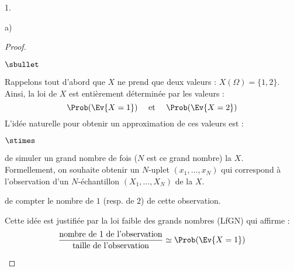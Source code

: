 \documentclass[11pt]{article}%
\begin{document}
\begin{noliste}{1.}
\begin{noliste}{a)}
\begin{proof}
\begin{noliste}{$\sbullet$}
      \item Rappelons tout d'abord que $X$ ne prend que deux valeurs :
        $X(\Omega) = \{1, 2\}$.\\
        Ainsi, la loi de $X$ est entièrement déterminée par les
        valeurs :
        \[
        \Prob(\Ev{X = 1}) \quad \text{ et } \quad \Prob(\Ev{X = 2})
        \]
        L'idée naturelle pour obtenir un approximation de ces valeurs
        est : 
        \begin{noliste}{$\stimes$}
        \item de simuler un grand nombre de fois ($N$ est ce grand
          nombre) la \var $X$.\\
          Formellement, on souhaite obtenir un $N$-uplet $(x_1,
          \ldots, x_N)$ qui correspond à l'observation d'un
          $N$-échantillon $(X_1, \ldots, X_N)$ de la \var $X$.
        \item de compter le nombre de $1$ (resp. de $2$) de cette
          observation.          
        \end{noliste}
        Cette idée est justifiée par la loi faible des grands nombres
        (LfGN) qui affirme : 
        \[
        \dfrac{\text{nombre de $1$ de l'observation}}{\text{taille de
            l'observation}} \simeq \Prob(\Ev{X = 1})
        \]





\end{noliste}
\end{proof}
\end{noliste}
\end{noliste}
\end{document}
